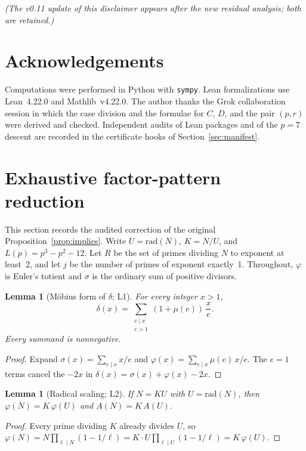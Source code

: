 \documentclass[11pt,reqno]{amsart}
\newcommand{\ph}{\varphi}
\newcommand{\sig}{\sigma}
\newtheorem{lemma}[theorem]{Lemma}
\theoremstyle{definition}
\begin{document}
\noindent\textit{(The v0.11 update of this disclaimer appears after the new residual analysis; both are retained.)}

\section*{Acknowledgements}

Computations were performed in Python with \texttt{sympy}. Lean formalizations use Lean~4.22.0 and Mathlib~v4.22.0. The author thanks the Grok collaboration session in which the case division and the formulae for \(C\), \(D\), and the pair \((p,r)\) were derived and checked. Independent audits of Lean packages and of the \(p=7\) descent are recorded in the certificate hooks of Section~\ref{sec:manifest}.



\section{Exhaustive factor-pattern reduction}
\label{sec:exhaustive}

This section records the audited correction of the original Proposition~\ref{prop:implies}. Write \(U=\mathrm{rad}(N)\), \(K=N/U\), and \(L(p)=p^3-p^2-12\). Let \(R\) be the set of primes dividing \(N\) to exponent at least~2, and let \(j\) be the number of primes of exponent exactly~1. Throughout, \(\ph\) is Euler's totient and \(\sig\) is the ordinary sum of positive divisors.

\begin{lemma}[M\"obius form of \(\delta\); L1]
\label{lem:L1}
For every integer \(x>1\),
\[
\delta(x)=\sum_{\substack{e\mid x\\ e>1}}(1+\mu(e))\,\frac{x}{e}.
\]
Every summand is nonnegative.
\end{lemma}

\begin{proof}
Expand \(\sig(x)=\sum_{e\mid x}x/e\) and \(\ph(x)=\sum_{e\mid x}\mu(e)\,x/e\). The \(e=1\) terms cancel the \(-2x\) in \(\delta(x)=\sig(x)+\ph(x)-2x\).
\end{proof}

\begin{lemma}[Radical scaling; L2]
\label{lem:L2}
If \(N=KU\) with \(U=\mathrm{rad}(N)\), then \(\ph(N)=K\,\ph(U)\) and \(A(N)=K\,A(U)\).
\end{lemma}

\begin{proof}
Every prime dividing \(K\) already divides \(U\), so \(\ph(N)=N\prod_{\ell\mid N}(1-1/\ell)=K\cdot U\prod_{\ell\mid U}(1-1/\ell)=K\,\ph(U)\).
\end{proof}
\end{document}
